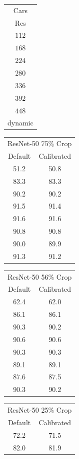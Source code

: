 \begin{table}
    \begin{tabular}{c|}
    Cars\\
    Res \\
    \hline
    $112$ \\ 
    $168$ \\ 
    $224$ \\ 
    $280$ \\ 
    $336$ \\ 
    $392$ \\ 
    $448$ \\
    dynamic\\
    \end{tabular}
    \begin{tabular}{|c|c|}
    \multicolumn{2}{|c|}{ ResNet-50 75\% Crop}\\
    Default & Calibrated \\
    \hline
    51.2 & {\color{red} 50.8} \\
    83.3 & 83.3\\ 
    90.2 & 90.2\\ 
    91.5 & 91.4\\ 
    91.6 & 91.6\\ 
    90.8 & 90.8\\ 
    90.0 & 89.9\\
    91.3 & 91.2\\ 
    \end{tabular}
    \begin{tabular}{|c|c|}
    \multicolumn{2}{|c|}{ ResNet-50 56\% Crop}\\
    Default & Calibrated  \\
    \hline
    62.4 & {\color{red}62.0} \\ 
    86.1 & 86.1 \\ 
    90.3 & 90.2 \\ 
    90.6 & 90.6 \\ 
    90.3 & 90.3 \\ 
    89.1 & 89.1 \\ 
    87.6 & 87.5 \\
    90.3 & 90.2 \\ 
    \end{tabular}
    \begin{tabular}{|c|c|}
    \multicolumn{2}{|c|}{ ResNet-50 25\% Crop}\\
    Default & Calibrated  \\
    \hline
    72.2 & {\color{red} 71.5} \\ 
    82.0 & 81.9 \\ 

\end{tabular}
\end{table}
